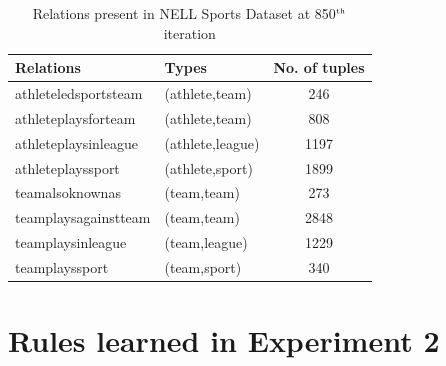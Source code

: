 \documentclass[akbc,twoside,11pt]{article}
\begin{document}
\begin{table}[H]
\centering
\begin{tabular}{ll|c}
Relations			&Types				& No. of tuples\\
\hline
athleteledsportsteam&(athlete,team) 	& 246\\
athleteplaysforteam	&(athlete,team)		& 808\\
athleteplaysinleague&(athlete,league) 	& 1197\\
athleteplayssport	&(athlete,sport) 	& 1899\\
teamalsoknownas	    &(team,team) 		& 273\\
teamplaysagainstteam&(team,team) 		& 2848\\
teamplaysinleague	&(team,league) 		& 1229\\
teamplayssport		&(team,sport) 		& 340\\
\end{tabular}
\caption{Relations present in NELL Sports Dataset at 850$^{\mbox{\tiny th}}$ iteration}\label{table:nell}
\end{table}

\section{Rules learned in Experiment 2}\label{appendix:2}
\end{document}
